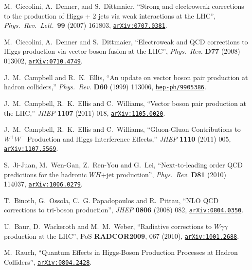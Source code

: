 \documentclass[english,12pt]{article}
\begin{document}
\begin{thebibliography}{10}
M.~Ciccolini, A.~Denner, and S.~Dittmaier, ``{Strong and electroweak
  corrections to the production of Higgs + 2 jets via weak interactions at the
  LHC}'', {\em Phys.\ Rev.\ Lett.}~{\bf 99} (2007) 161803,
\href{http://www.arXiv.org/abs/0707.0381}{{\tt arXiv:0707.0381}}.

M.~Ciccolini, A.~Denner and S.~Dittmaier, ``{Electroweak and QCD corrections
  to Higgs production via vector-boson fusion at the LHC}'', {\em Phys.\ Rev.}
  {\bf D77} (2008) 013002,
\href{http://www.arXiv.org/abs/0710.4749}{{\tt arXiv:0710.4749}}.

  J.~M.~Campbell and R.~K.~Ellis,
  ``An update on vector boson pair production at hadron colliders,''
  {\em Phys.\ Rev.} {\bf D60} (1999) 113006,
  \href{http://www.arXiv.org/abs/hep-ph/9905386}{{\tt hep-ph/9905386}}.

  J.~M.~Campbell, R.~K.~Ellis and C.~Williams,
  ``Vector boson pair production at the LHC,''
  {\em JHEP} {\bf 1107} (2011) 018,
  \href{http://www.arXiv.org/abs/1105.0020}{{\tt arXiv:1105.0020}}.

  J.~M.~Campbell, R.~K.~Ellis and C.~Williams,
  ``Gluon-Gluon Contributions to $W^{+}W^{-}$ Production and Higgs Interference Effects,''
  {\em JHEP} {\bf 1110} (2011) 005,
  \href{http://www.arXiv.org/abs/1107.5569}{{\tt arXiv:1107.5569}}.

  S.~Ji-Juan, M.~Wen-Gan, Z.~Ren-You and G.~Lei,
  ``{Next-to-leading order QCD predictions for the hadronic $WH$+jet production}'',
  {\em Phys.\ Rev.} {\bf D81} (2010) 114037,
\href{http://www.arXiv.org/abs/1006.0279}{{\tt arXiv:1006.0279}}.

T.~Binoth, G.~Ossola, C.~G. Papadopoulos and R.~Pittau, ``{NLO QCD corrections
  to tri-boson production}'', {\em JHEP} {\bf 0806} (2008) 082,
\href{http://www.arXiv.org/abs/0804.0350}{{\tt arXiv:0804.0350}}.

  U.~Baur, D.~Wackeroth and M.~M.~Weber,
  ``{Radiative corrections to $W \gamma \gamma$ production at the LHC}'',
  PoS {\bf RADCOR2009}, 067 (2010),
\href{http://www.arXiv.org/abs/1001.2688}{{\tt arXiv:1001.2688}}.

  M.~Rauch,
  ``Quantum Effects in Higgs-Boson Production Processes at Hadron Colliders'',
 \href{http://arxiv.org/abs/0804.2428}{{\tt arXiv:0804.2428}}.


\end{thebibliography}
\end{document}

